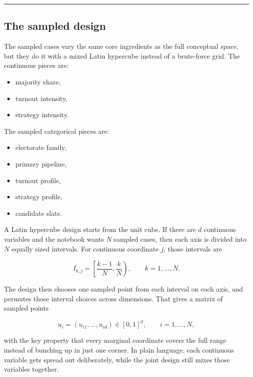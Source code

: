 \documentclass[11pt]{article}
\providecommand{\tightlist}{%
      \setlength{\itemsep}{0pt}\setlength{\parskip}{0pt}}
\begin{document}
    \begin{center}\rule{0.5\linewidth}{0.5pt}\end{center}

\subsection{The sampled design}\label{the-sampled-design}

The sampled cases vary the same core ingredients as the full conceptual
space, but they do it with a mixed Latin hypercube instead of a
brute-force grid. The continuous pieces are:

\begin{itemize}
\tightlist
\item
  majority share,
\item
  turnout intensity,
\item
  strategy intensity.
\end{itemize}

The sampled categorical pieces are:

\begin{itemize}
\tightlist
\item
  electorate family,
\item
  primary pipeline,
\item
  turnout profile,
\item
  strategy profile,
\item
  candidate slate.
\end{itemize}

A Latin hypercube design starts from the unit cube. If there are \(d\)
continuous variables and the notebook wants \(N\) sampled cases, then
each axis is divided into \(N\) equally sized intervals. For continuous
coordinate \(j\), those intervals are

\[
I_{k,j} = \left[\frac{k-1}{N}, \frac{k}{N}\right), \qquad k = 1, \dots, N.
\]

The design then chooses one sampled point from each interval on each
axis, and permutes those interval choices across dimensions. That gives
a matrix of sampled points

\[
u_i = (u_{i1}, \dots, u_{id}) \in [0,1]^d, \qquad i = 1, \dots, N,
\]

with the key property that every marginal coordinate covers the full
range instead of bunching up in just one corner. In plain language, each
continuous variable gets spread out deliberately, while the joint design
still mixes those variables together.
\end{document}
